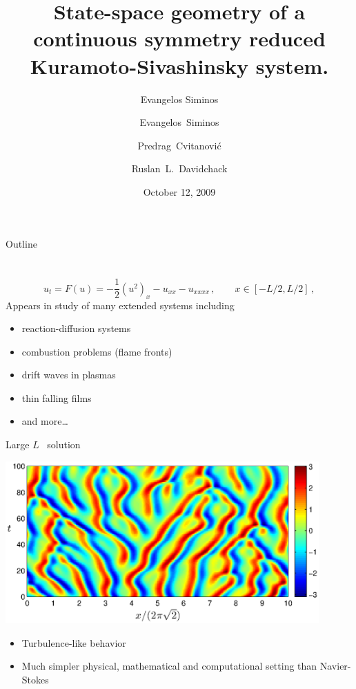 \documentclass{beamer}
\title{State-space geometry of a continuous symmetry reduced Kuramoto-Sivashinsky system.}
\author{Evangelos Siminos}
\author[Siminos, Cvitanovi\'c, Davidchack]
{
  \textcolor{green!50!black}{Evangelos~Siminos}\inst{1} \and
  {Predrag~Cvitanovi\'c}\inst{1} \and
  {Ruslan~L.~Davidchack}\inst{2}
}
\institute
{
  \inst{1}%
  Georgia Institute of Technology, USA
  \and
  \vskip-2mm
  \inst{2}%
  University of Leicester, United Kingdom
}
\date{October 12, 2009}
\begin{document}
\begin{frame}
  \titlepage
\end{frame}

\begin{frame}{Outline}
  \tableofcontents
\end{frame}


\section[KSe]{\KSe}

\begin{frame}{\KSe}
\[
  u_t = F(u) = -{\textstyle\frac{1}{2}}(u^2)_x-u_{xx}-u_{xxxx}
    \,,\qquad   x \in [-L/2,L/2]
    \,, 
\]
Appears in study of many extended systems including
\begin{itemize}
 \item reaction-diffusion systems
 \item combustion problems (flame fronts)
 \item drift waves in plasmas
 \item thin falling films
 \item and more\ldots
\end{itemize}

\end{frame}

\begin{frame}{Large $L$ \KSe\ solution}

\begin{center}
  \includegraphics[width=0.9\textwidth,height=0.5\textheight,clip=true]{../../figs/ks_largeL_cbar.eps}
\end{center}

\begin{itemize}
\item Turbulence-like behavior
\item Much simpler physical, mathematical and computational setting than Navier-Stokes  
\end{itemize}

\end{frame}
\end{document}
